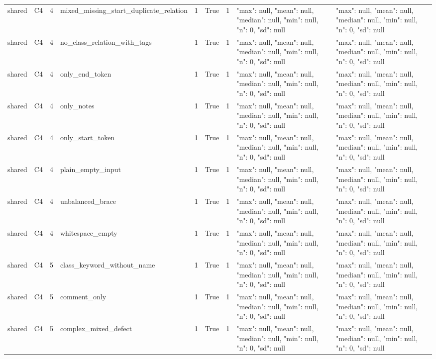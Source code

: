 \begin{tabular}{lllllllll}
shared & C4 & 4 & mixed\_missing\_start\_duplicate\_relation & 1 & True & 1 & {"max": null, "mean": null, "median": null, "min": null, "n": 0, "sd": null} & {"max": null, "mean": null, "median": null, "min": null, "n": 0, "sd": null} \\
shared & C4 & 4 & no\_class\_relation\_with\_tags & 1 & True & 1 & {"max": null, "mean": null, "median": null, "min": null, "n": 0, "sd": null} & {"max": null, "mean": null, "median": null, "min": null, "n": 0, "sd": null} \\
shared & C4 & 4 & only\_end\_token & 1 & True & 1 & {"max": null, "mean": null, "median": null, "min": null, "n": 0, "sd": null} & {"max": null, "mean": null, "median": null, "min": null, "n": 0, "sd": null} \\
shared & C4 & 4 & only\_notes & 1 & True & 1 & {"max": null, "mean": null, "median": null, "min": null, "n": 0, "sd": null} & {"max": null, "mean": null, "median": null, "min": null, "n": 0, "sd": null} \\
shared & C4 & 4 & only\_start\_token & 1 & True & 1 & {"max": null, "mean": null, "median": null, "min": null, "n": 0, "sd": null} & {"max": null, "mean": null, "median": null, "min": null, "n": 0, "sd": null} \\
shared & C4 & 4 & plain\_empty\_input & 1 & True & 1 & {"max": null, "mean": null, "median": null, "min": null, "n": 0, "sd": null} & {"max": null, "mean": null, "median": null, "min": null, "n": 0, "sd": null} \\
shared & C4 & 4 & unbalanced\_brace & 1 & True & 1 & {"max": null, "mean": null, "median": null, "min": null, "n": 0, "sd": null} & {"max": null, "mean": null, "median": null, "min": null, "n": 0, "sd": null} \\
shared & C4 & 4 & whitespace\_empty & 1 & True & 1 & {"max": null, "mean": null, "median": null, "min": null, "n": 0, "sd": null} & {"max": null, "mean": null, "median": null, "min": null, "n": 0, "sd": null} \\
shared & C4 & 5 & class\_keyword\_without\_name & 1 & True & 1 & {"max": null, "mean": null, "median": null, "min": null, "n": 0, "sd": null} & {"max": null, "mean": null, "median": null, "min": null, "n": 0, "sd": null} \\
shared & C4 & 5 & comment\_only & 1 & True & 1 & {"max": null, "mean": null, "median": null, "min": null, "n": 0, "sd": null} & {"max": null, "mean": null, "median": null, "min": null, "n": 0, "sd": null} \\
shared & C4 & 5 & complex\_mixed\_defect & 1 & True & 1 & {"max": null, "mean": null, "median": null, "min": null, "n": 0, "sd": null} & {"max": null, "mean": null, "median": null, "min": null, "n": 0, "sd": null} \\

\end{tabular}
